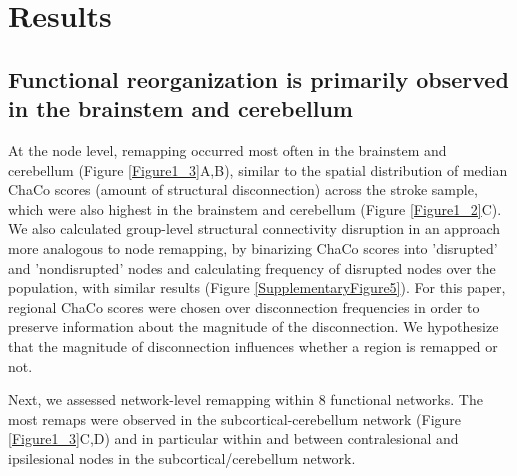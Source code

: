 \documentclass[phd,tocprelim]{cornell}
\begin{document}
	
\section{Results}
	\subsection{Functional reorganization is primarily observed in the brainstem and cerebellum}
	At the node level, remapping occurred most often in the brainstem and cerebellum (Figure \ref{Figure1_3}A,B), similar to the spatial distribution of median ChaCo scores (amount of structural disconnection) across the stroke sample, which were also highest in the brainstem and cerebellum (Figure \ref{Figure1_2}C). We also calculated group-level structural connectivity disruption in an approach more analogous to node remapping, by binarizing ChaCo scores into 'disrupted' and 'nondisrupted' nodes and calculating frequency of disrupted nodes over the population, with similar results (Figure \ref{SupplementaryFigure5}). For this paper, regional ChaCo scores were chosen over disconnection frequencies in order to preserve information about the magnitude of the disconnection. We hypothesize that the magnitude of disconnection influences whether a region is remapped or not.
	
	Next, we assessed network-level remapping within 8 functional networks. The most remaps were observed in the subcortical-cerebellum network (Figure \ref{Figure1_3}C,D) and in particular within and between contralesional and ipsilesional nodes in the subcortical/cerebellum network.
	
\end{document}
